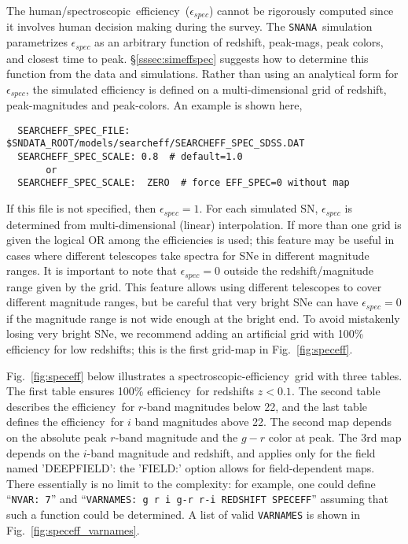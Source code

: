 \documentclass[12pt]{article}
\newcommand{\snana}{{\tt SNANA}}
\newcommand{\eff}{efficiency}
\newcommand{\simeffspec}{\epsilon_{spec}}
\newcommand{\spec}{spectroscopic}
\begin{document}
{The human/\spec\ \eff\ ($\simeffspec$) cannot be rigorously computed
since it involves human decision making during the survey.
The \snana\ simulation parametrizes $\simeffspec$ as an arbitrary
function of redshift, peak-mags, peak colors, and closest time to peak.
\S\ref{sssec:simeffspec} suggests how to determine
this function from the data and simulations.
Rather than using an analytical form for $\simeffspec$,
the simulated efficiency is defined on a multi-dimensional
grid of redshift, peak-magnitudes and peak-colors.
An example is shown here,
\begin{verbatim}
  SEARCHEFF_SPEC_FILE:  $SNDATA_ROOT/models/searcheff/SEARCHEFF_SPEC_SDSS.DAT
  SEARCHEFF_SPEC_SCALE: 0.8  # default=1.0
       or
  SEARCHEFF_SPEC_SCALE:  ZERO  # force EFF_SPEC=0 without map
\end{verbatim}
If this file is not specified, then $\simeffspec=1$.
For each simulated SN, $\simeffspec$ is determined from 
multi-dimensional (linear) interpolation. 
If more than one grid is given 
the logical OR among the efficiencies is used;
this feature may be useful in cases where different telescopes
take spectra for SNe in different magnitude ranges.
It is important to note that $\simeffspec=0$ outside
the redshift/magnitude range given by the grid.
This feature allows using different telescopes to cover
different magnitude ranges, but be careful that very bright
SNe can have $\simeffspec=0$ if the magnitude range is not
wide enough at the bright end. To avoid mistakenly losing 
very bright SNe, we recommend adding an artificial 
grid with 100\% efficiency for low redshifts;
this is the first grid-map in Fig.~\ref{fig:speceff}.


Fig.~\ref{fig:speceff} below illustrates a
\spec-\eff\ grid with three tables.
The first table ensures 100\% \eff\ for redshifts $z<0.1$.
The second table describes the \eff\ for $r$-band magnitudes 
below 22, and the last table defines the \eff\ for
$i$ band magnitudes above 22. 
The second map depends on the absolute peak $r$-band magnitude
and the $g-r$ color at peak.
The 3rd map depends on the $i$-band magnitude and redshift,
and applies only for the field named 'DEEPFIELD':
the 'FIELD:' option allows for field-dependent maps.
There essentially is no limit to the complexity: 
for example, one could define ``{\tt NVAR: 7}'' 
and ``{\tt VARNAMES: g  r  i  g-r  r-i  REDSHIFT SPECEFF}''
assuming that such a function could be determined.
A list of valid {\tt VARNAMES} is shown in 
Fig.~\ref{fig:speceff_varnames}.

}
\end{document}
